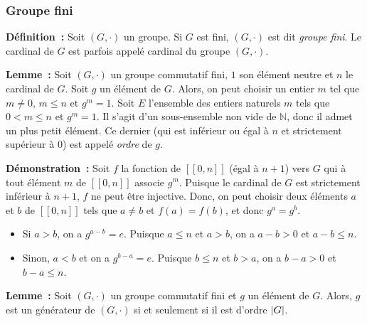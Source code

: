 \subsubsection{Groupe fini}

\noindent\textbf{Définition :} Soit $(G, \cdot)$ un groupe. Si $G$ est fini, $(G, \cdot)$ est dit \textit{groupe fini}.
    Le cardinal de $G$ est parfois appelé cardinal du groupe $(G, \cdot)$.

\medskip

\noindent\textbf{Lemme :} Soit $(G, \cdot)$ un groupe commutatif fini, $1$ son élément neutre et $n$ le cardinal de $G$. 
    Soit $g$ un élément de $G$. 
    Alors, on peut choisir un entier $m$ tel que $m \neq 0$, $m \leq n$ et $g^m = 1$. 
    Soit $E$ l'ensemble des entiers naturels $m$ tels que $0 < m \leq n$ et $g^m = 1$.
    Il s'agit d'un sous-ensemble non vide de $\mathbb{N}$, donc il admet un plus petit élément. 
    Ce dernier (qui est inférieur ou égal à $n$ et strictement supérieur à $0$) est appelé \textit{ordre} de $g$.

\medskip

\noindent\textbf{Démonstration :} Soit $f$ la fonction de $[\![0, n]\!]$ (égal à $n+1$) vers $G$ qui à tout élément $m$ de $[\![0, n]\!]$ associe $g^m$. 
    Puisque le cardinal de $G$ est strictement inférieur à $n+1$, $f$ ne peut être injective.
    Donc, on peut choisir deux éléments $a$ et $b$ de $[\![0,n]\!]$ tels que $a \neq b$ et $f(a) = f(b)$, et donc $g^a = g^b$. 
    \begin{itemize}[nosep]
        \item Si $a > b$, on a $g^{a-b} = e$.
            Puisque $a \leq n$ et $a > b$, on a $a-b > 0$ et $a-b \leq n$. 
        \item Sinon, $a < b$ et on a $g^{b-a} = e$.
            Puisque $b \leq n$ et $b > a$, on a $b-a > 0$ et $b-a \leq n$. 
    \end{itemize}

    \done

\medskip

\noindent\textbf{Lemme :} Soit $(G, \cdot)$ un groupe commutatif fini et $g$ un élément de $G$. 
    Alors, $g$ est un générateur de $(G, \cdot)$ si et seulement si il est d'ordre $\left\lvert G \right\rvert$. 

\medskip

